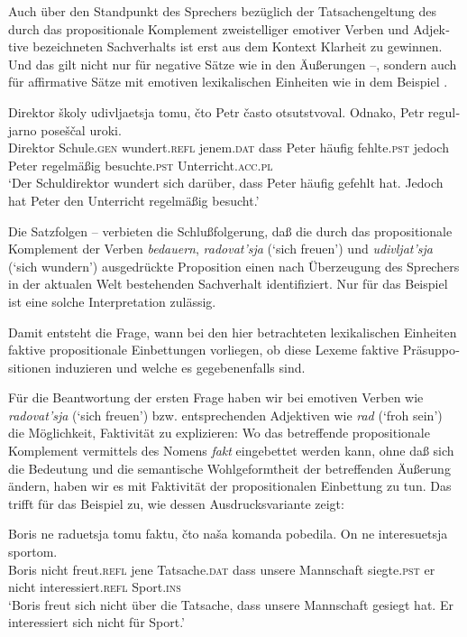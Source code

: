 \documentclass[output=paper]{langscibook}
\begin{document}
\begin{otherlanguage}{german}
Auch über den Standpunkt des Sprechers bezüglich der Tatsachengeltung des durch das propositionale Komplement zweistelliger emotiver Verben und Adjektive bezeichneten Sachverhalts ist erst aus dem Kontext Klarheit zu gewinnen. Und das gilt nicht nur für negative Sätze wie in den Äußerungen --, sondern auch für affirmative Sätze mit emotiven lexikalischen Einheiten wie in dem Beispiel .

\ea \label{ex:zi83:51}
    \gll Direktor školy udivljaetsja tomu, čto Petr často otsutstvoval. Odnako, Petr reguljarno poseščal uroki. \\
    Direktor  Schule.\textsc{gen} wundert.\textsc{refl} jenem.\textsc{dat} dass Peter häufig fehlte.\textsc{pst} jedoch Peter regelmäßig besuchte.\textsc{pst} Unterricht.\textsc{acc}.\textsc{pl} \\
    \glt ‘Der Schuldirektor wundert sich darüber, dass Peter häufig gefehlt hat. Jedoch hat Peter den Unterricht regelmäßig besucht.’
\z

\noindent Die Satzfolgen -- verbieten die Schlußfolgerung, daß die durch das pro\-po\-si\-tio\-na\-le Komplement der Verben \textit{bedauern}, \textit{radovat’sja} (‘sich freuen’) und \textit{udi\-vljat’sja} (‘sich wundern’) ausgedrückte Proposition einen nach Überzeugung des Sprechers in der aktualen Welt bestehenden Sachverhalt identifiziert. Nur für das Beispiel  ist eine solche Interpretation zulässig.

Damit entsteht die Frage, wann bei den hier betrachteten lexikalischen Einheiten faktive propositionale Einbettungen vorliegen, ob diese Lexeme faktive Präsuppositionen induzieren und welche es gegebenenfalls sind.

Für die Beantwortung der ersten Frage haben wir bei emotiven Verben wie  \textit{radovat’sja} (‘sich freuen’) bzw. entsprechenden Adjektiven wie \textit{rad} (‘froh sein’) die Möglichkeit, Faktivität zu explizieren: Wo das betreffende propositionale Komplement vermittels des Nomens \textit{fakt} eingebettet werden kann, ohne daß sich die Bedeutung und die semantische Wohlgeformtheit der betreffenden Äußerung ändern, haben wir es mit Faktivität der propositionalen Einbettung zu tun. Das trifft für das Beispiel  zu, wie dessen Ausdrucksvariante  zeigt:

\ea \label{ex:zi83:52}
    \gll Boris ne raduetsja tomu faktu, čto naša komanda pobedila. On ne interesuetsja sportom. \\
    Boris nicht freut.\textsc{refl} jene  Tatsache.\textsc{dat} dass unsere Mannschaft siegte.\textsc{pst} er nicht interessiert.\textsc{refl} Sport.\textsc{ins} \\
    \glt ‘Boris freut sich nicht über die Tatsache, dass unsere Mannschaft gesiegt hat. Er interessiert sich nicht für Sport.’
\z


\end{otherlanguage}
\end{document}
